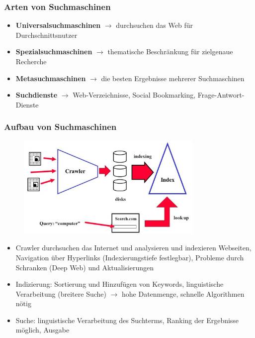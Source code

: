 \subsubsection{Arten von Suchmaschinen}

\begin{itemize}
  \item \textbf{Universalsuchmaschinen} $\rightarrow$ durchsuchen das Web für Durchschnittsnutzer
  \item \textbf{Spezialsuchmaschinen} $\rightarrow$ thematische Beschränkung für zielgenaue Recherche
  \item \textbf{Metasuchmaschinen} $\rightarrow$ die besten Ergebnisse mehrerer Suchmaschinen
  \item \textbf{Suchdienste} $\rightarrow$ Web-Verzeichnisse, Social Bookmarking, Frage-Antwort-Dienste
\end{itemize}

\clearpage
\subsubsection{Aufbau von Suchmaschinen}

\begin{figure}[ht]
\begin{center}
  \includegraphics[width=0.8\textwidth]{assets/Search.png}
\end{center}
\end{figure}

\begin{itemize}
  \item Crawler durchsuchen das Internet und analysieren und indexieren Webseiten, Navigation über Hyperlinks (Indexierungstiefe festlegbar), Probleme durch Schranken (Deep Web) und Aktualisierungen
  \item Indizierung: Sortierung und Hinzufügen von Keywords, linguistische Verarbeitung (breitere Suche) $\rightarrow$ hohe Datenmenge, schnelle Algorithmen nötig
  \item Suche: linguistische Verarbeitung des Suchterms, Ranking der Ergebnisse möglich, Ausgabe
\end{itemize}

